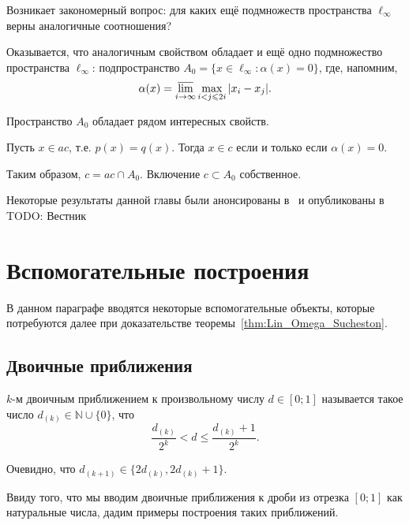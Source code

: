 Возникает закономерный вопрос: для каких ещё подмножеств пространства $\ell_\infty$
верны аналогичные соотношения?

Оказывается, что аналогичным свойством обладает и ещё одно подмножество пространства $\ell_\infty$: подпространство
$A_0 = \{ x \in \ell_\infty : \alpha(x) =0 \}$,
где, напомним,
\begin{equation*}
	\alpha(x) = \varlimsup_{i\to\infty} \max_{i<j\leqslant 2i} |x_i - x_j|
	.
\end{equation*}

Пространство $A_0$ обладает рядом интересных свойств.


\begin{theorem}
	\label{thm:alpha_c_ac_c}
	Пусть $x\in ac$, т.е. $p(x) = q(x)$.
	Тогда $x\in c$ если и только если $\alpha(x) = 0$.
\end{theorem}
Таким образом, $c = ac \cap A_0$.
Включение $c\subset A_0$ собственное.

Некоторые результаты данной главы были анонсированы в~\cite{our-mz2021linearhulls}
и опубликованы в TODO: Вестник

\section{Вспомогательные построения}

В данном параграфе вводятся некоторые вспомогательные объекты,
которые потребуются далее при доказательстве теоремы~\ref{thm:Lin_Omega_Sucheston}.

\subsection{Двоичные приближения}

\begin{definition}
	$k$-м двоичным приближением к произвольному числу $d\in[0;1]$
	называется такое число $d_{(k)}\in\mathbb{N}\cup\{0\}$,
	что
	\begin{equation}
		\label{eq:binary_approximations_for_number}
		\frac{d_{(k)}}{2^k} < d \leq \frac{d_{(k)}+1}{2^k}
		.
	\end{equation}
\end{definition}

\begin{remark}
	Очевидно, что $d_{(k+1)}\in\{2d_{(k)},2d_{(k)}+1\}$.
\end{remark}

Ввиду того, что мы вводим двоичные приближения к дроби из отрезка $[0;1]$ как натуральные числа,
дадим примеры построения таких приближений.


